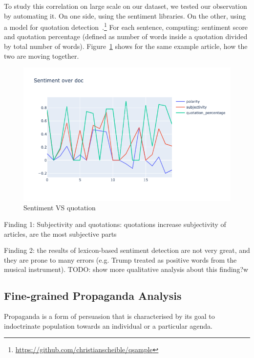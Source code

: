 To study this correlation on large scale on our dataset, we tested our observation by automating it.
On one side, using the sentiment libraries. On the other, using a model for quotation detection~\citep{scheible2016model}.\footnote{\url{https://github.com/christianscheible/qsample}}
For each sentence, computing: sentiment score and quotation percentage (defined as number of words inside a quotation divided by total number of words).
Figure~\ref{fig:sentiment_vs_quotation} shows for the same example article, how the two are moving together.

\begin{figure}[!htbp]
    \centering
    \includegraphics[width=\linewidth]{figures/sentiment_vs_quotation.png}
    \caption{Sentiment VS quotation}
    \label{fig:sentiment_vs_quotation}
\end{figure}


Finding 1:
Subjectivity and quotations: quotations increase subjectivity of articles, are the most subjective parts

Finding 2: the results of lexicon-based sentiment detection are not very great, and they are prone to many errors (e.g. Trump treated as positive words from the musical instrument).
TODO: show more qualitative analysis about this finding?w

\subsection{\statusorange Fine-grained Propaganda Analysis}

Propaganda is a form of persuasion that is characterised by its goal to indoctrinate population towards an individual or a particular agenda.

